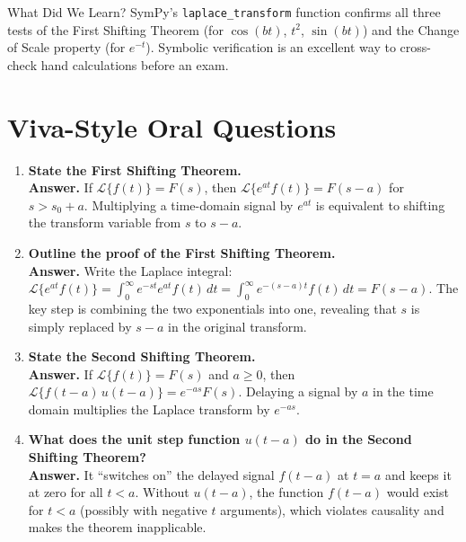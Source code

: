 \documentclass[12pt,a4paper]{article}
\begin{document}
\begin{learnbox}{What Did We Learn?}
SymPy's \texttt{laplace\_transform} function confirms all three tests of the First Shifting
Theorem (for $\cos(bt)$, $t^2$, $\sin(bt)$) and the Change of Scale property (for $e^{-t}$).
Symbolic verification is an excellent way to cross-check hand calculations before an exam.
\end{learnbox}

\section{Viva-Style Oral Questions}

\begin{enumerate}

\item \textbf{State the First Shifting Theorem.}\\
\textbf{Answer.} If $\mathcal{L}\{f(t)\} = F(s)$, then $\mathcal{L}\{e^{at}f(t)\} = F(s-a)$
for $s > s_0 + a$. Multiplying a time-domain signal by $e^{at}$ is equivalent to shifting the
transform variable from $s$ to $s - a$.

\item \textbf{Outline the proof of the First Shifting Theorem.}\\
\textbf{Answer.} Write the Laplace integral:
$\mathcal{L}\{e^{at}f(t)\} = \int_0^\infty e^{-st}e^{at}f(t)\,dt
= \int_0^\infty e^{-(s-a)t}f(t)\,dt = F(s-a).$
The key step is combining the two exponentials into one, revealing that $s$ is simply replaced
by $s-a$ in the original transform.

\item \textbf{State the Second Shifting Theorem.}\\
\textbf{Answer.} If $\mathcal{L}\{f(t)\} = F(s)$ and $a \geq 0$, then
$\mathcal{L}\{f(t-a)\,u(t-a)\} = e^{-as}F(s).$
Delaying a signal by $a$ in the time domain multiplies the Laplace transform by $e^{-as}$.

\item \textbf{What does the unit step function $u(t-a)$ do in the Second Shifting Theorem?}\\
\textbf{Answer.} It ``switches on'' the delayed signal $f(t-a)$ at $t = a$ and keeps it
at zero for all $t < a$. Without $u(t-a)$, the function $f(t-a)$ would exist for $t < a$
(possibly with negative $t$ arguments), which violates causality and makes the theorem
inapplicable.


\end{enumerate}
\end{document}
